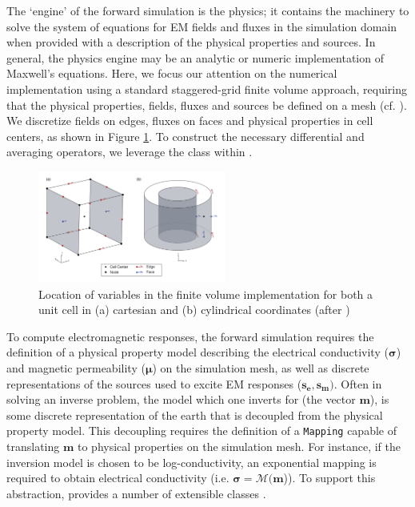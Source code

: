The `engine' of the forward simulation is the physics; it contains the
machinery to solve the system of equations for EM fields and fluxes in the
simulation domain when provided with a description of the physical properties
and sources. In general, the physics engine may be an analytic or numeric
implementation of Maxwell's equations. Here, we focus our attention on the
numerical implementation using a standard staggered-grid finite volume
approach, requiring that the physical properties, fields, fluxes and sources
be defined on a mesh (cf. \cite{Haber2014a, Hyman2002, Hyman1999, Yee1966}).
We discretize fields on edges, fluxes on faces and physical properties in cell
centers, as shown in Figure \ref{fig:finiteVolumes}. To construct the
necessary differential and averaging operators, we leverage the \Mesh class
within \SimPEG \citep{Cockett2015, FV_Tutorial}.
\begin{figure}[htb!]
    \centering
    \includegraphics[width=0.55\textwidth]{images/finiteVolume-02}
    \caption{Location of variables in the finite volume implementation for both a unit cell in (a) cartesian and (b) cylindrical coordinates (after \cite{Heagy2015})}
\label{fig:finiteVolumes}
\end{figure}


To compute electromagnetic responses, the forward simulation requires the
definition of a physical property model describing the electrical conductivity
($\boldsymbol{\sigma}$) and magnetic permeability ($\boldsymbol{\mu}$) on the
simulation mesh, as well as discrete representations of the sources used to
excite EM responses ($\boldsymbol{s_e}, \boldsymbol{s_m})$. Often in solving
an inverse problem, the model which one inverts for (the vector $\mathbf{m}$),
is some discrete representation of the earth that is decoupled from the
physical property model. This decoupling requires the definition of a
\texttt{Mapping} capable of translating $\mathbf{m}$ to physical properties on
the simulation mesh. For instance, if the inversion model is chosen to be
log-conductivity, an exponential mapping is required to obtain electrical
conductivity (i.e. $\boldsymbol{\sigma} = \mathcal{M}(\mathbf{m}$)). To
support this abstraction, \SimPEG provides a number of extensible \Mapping
classes \citep{Cockett2015, Kang2015}.

